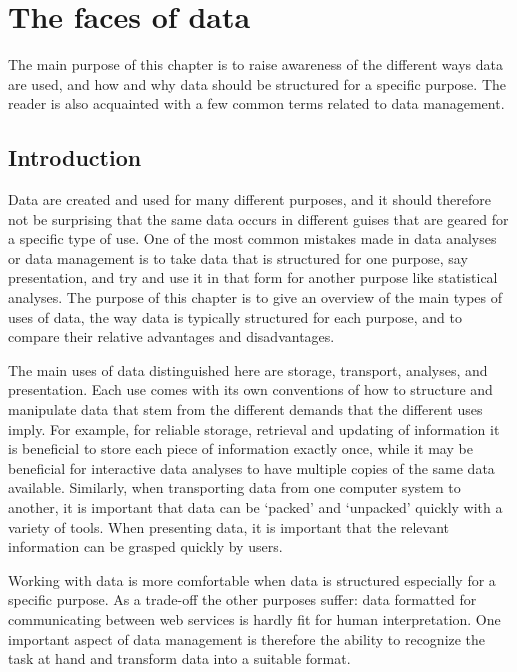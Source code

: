 
\chapter{The faces of data}
\label{sect:faces}
The main purpose of this chapter is to raise awareness of the different ways
data are used, and how and why data should be structured for a specific purpose.
The reader is also acquainted with a few common terms related to data
management.

\section{Introduction}
\label{sect:faces:introduction}
Data are created and used for many different purposes, and it should therefore
not be surprising that the same data occurs in different guises that are
geared for a specific type of use.  One of the most common mistakes made in
data analyses or data management is to take data that is structured for one
purpose, say presentation, and try and use it in that form for another purpose like
statistical analyses. The purpose of this chapter is to give an overview
of the main types of uses of data, the way data is typically structured for
each purpose, and to compare their relative advantages and disadvantages.




The main uses of data distinguished here are storage, transport, analyses, and
presentation. Each use comes with its own conventions of how to
structure and manipulate data that stem from the different demands that the
different uses imply. For example, for reliable storage, retrieval and updating
of information it is beneficial to store each piece of information exactly
once, while it may be beneficial for interactive data analyses to have multiple
copies of the same data available.  Similarly, when transporting data from one
computer system to another, it is important that data can be `packed' and
`unpacked' quickly with a variety of tools. When presenting data, it is
important that the relevant information can be grasped quickly by users.


Working with data is more comfortable when data is structured especially for a
specific purpose. As a trade-off the other purposes suffer: data formatted for
communicating between web services is hardly fit for human interpretation. One
important aspect of data management is therefore the ability to recognize the
task at hand and transform data into a suitable format. 

